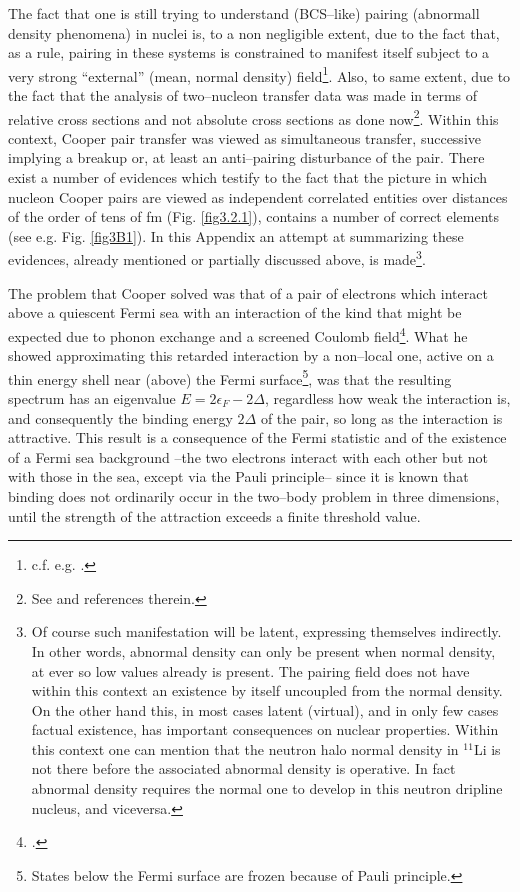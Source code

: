 \begin{subappendices}
The fact that one is still trying to understand (BCS--like) pairing (abnormall density phenomena) in nuclei is, to a non negligible extent, due to the fact that, as a rule, pairing in these systems is constrained to manifest itself subject to a very strong ``external'' (mean, normal density) field\footnote{c.f. e.g. \cite{Matsuo:13}.}. Also, to same extent, due to the fact that the analysis of two--nucleon transfer data was made in terms of relative cross sections and not absolute cross sections as done now\footnote{See \cite{Potel:13} and references therein.}. Within this context, Cooper pair transfer was viewed as simultaneous transfer, successive implying a breakup or, at least an anti--pairing disturbance of the pair. There exist a number of evidences which testify to the fact that the picture in which nucleon Cooper pairs are viewed as independent correlated entities over distances of the order of tens of fm (Fig. \ref{fig3.2.1}), contains a number of correct elements (see e.g. Fig. \ref{fig3B1}). In this Appendix an attempt at summarizing these evidences, already mentioned or partially discussed above, is made\footnote{Of course such manifestation will be latent, expressing themselves indirectly. In other words, abnormal density can only be present when normal density, at ever so low values already is present. The pairing field does not have within this context an existence by itself uncoupled from the normal density. On the other hand this, in most cases latent (virtual), and in only few cases factual existence, has important consequences on nuclear properties. Within this context one can mention that the neutron halo normal density in $^{11}$Li is not there before the associated abnormal density is operative. In fact abnormal density requires the normal one to develop in this neutron dripline nucleus, and viceversa.}.


 The problem that Cooper solved was that of a pair of electrons which interact above a quiescent Fermi sea with  an interaction of the kind that might be expected due to  phonon exchange and a screened Coulomb field\footnote{\cite{Cooper:56}.}. What he showed approximating this retarded interaction by a non--local one, active on a thin energy shell near (above) the Fermi surface\footnote{States below the Fermi surface are frozen because of Pauli principle.}, was that the resulting spectrum has an eigenvalue $E=2\epsilon_F-2\Delta$, regardless how weak the interaction is, and consequently the binding energy $2\Delta$ of the pair, so long as the interaction is attractive. This result is a consequence of the Fermi statistic and of the existence of a Fermi sea background --the two electrons interact with each other but not with those in the sea, except via the Pauli principle-- since it is  known that binding does not ordinarily occur in the two--body problem in three dimensions, until the strength of the attraction exceeds a finite threshold value.


\end{subappendices}
